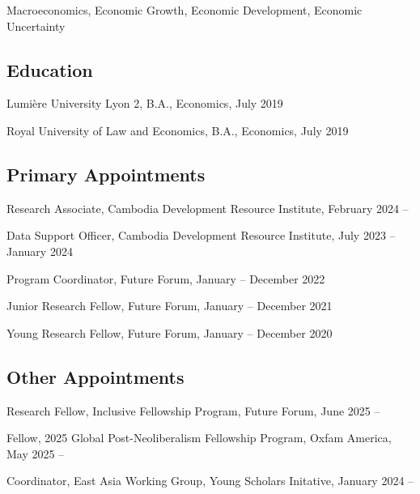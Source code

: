 \documentclass[10pt,a4paper]{article}
\begin{document}
	Macroeconomics, Economic Growth, Economic Development, Economic Uncertainty

\subsection*{Education}
	
	Lumière University Lyon 2, B.A., Economics, July 2019
	
	Royal University of Law and Economics, B.A., Economics, July 2019 
	

\subsection*{Primary Appointments}	


		Research Associate, Cambodia Development Resource Institute,  February 2024 --
		
		Data Support Officer, Cambodia Development Resource Institute, July 2023 -- January 2024
		
		Program Coordinator, Future Forum, January -- December 2022
		
		Junior Research Fellow, Future Forum, January -- December 2021
		
		Young Research Fellow, Future Forum, January -- December 2020

\subsection*{Other Appointments}
	
	Research Fellow, Inclusive Fellowship Program, Future Forum, June 2025 --
	
	Fellow, 2025 Global Post-Neoliberalism Fellowship Program, Oxfam America, May 2025 --
	
	Coordinator, East Asia Working Group, Young Scholars Initative, January 2024 --
		
\end{document}
